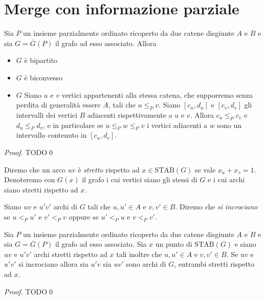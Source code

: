 \section{Merge con informazione parziale} 
\begin{lemma}
	\label{structurelemma} Sia \(P\) un insieme parzialmente ordinato ricoperto da due catene disgiunte \(A\) e \(B\) e sia \(G=\overline{G}(P)\) il grafo ad esso associato. Allora 
	\begin{itemize}
		\item \(G\) è bipartito 
		\item \(G\) è biconvesso 
		\item \(G\) Siano \(u\) e \(v\) vertici appartenenti alla stessa catena, che supporremo senza perdita di generalità essere \(A\), tali che \(u\le_{P} v\). Siano \([c_u,d_u]\) e \([c_v,d_v]\) gli intervalli dei vertici \(B\) adiacenti rispettivamente a \(u\) e \(v\). Allora \(c_u\le_{P} c_v\) e \(d_u\le_{P} d_v\), e in particolare se \(u\le_{P}w\le_{P}v\) i vertici adiacenti a \(w\) sono un intervallo contenuto in \([c_u,d_v]\). 
	\end{itemize}
\end{lemma}
\begin{proof}
	TODO\qed 
\end{proof}
\begin{definition}
	Diremo che un arco \(uv\) è \emph{stretto} rispetto ad \(x\in\text{STAB}(G)\) se vale \(x_u+x_v=1\). Denoteremo con \(G(x)\) il grafo i cui vertici siano gli stessi di \(G\) e i cui archi siano stretti rispetto ad \(x\). 
\end{definition}
\begin{definition}
	Siano \(uv\) e \(u'v'\) archi di \(G\) tali che \(u,u'\in A\) e \(v,v'\in B\). Diremo che \emph{si incrociano} se \(u<_{P}u'\) e \(v'<_{P}v\) oppure se \(u'<_{P}u\) e \(v<_{P}v'\). 
\end{definition}
\begin{lemma}
	\label{crossinglemma} Sia \(P\) un insieme parzialmente ordinato ricoperto da due catene disgiunte \(A\) e \(B\) e sia \(G=\overline{G}(P)\) il grafo ad esso associato. Sia \(x\) un punto di \(\text{STAB}(G)\) e siano \(uv\) e \(u'v'\) archi stretti rispetto ad \(x\) tali inoltre che \(u,u'\in A\) e \(v,v'\in B\). Se \(uv\) e \(u'v'\) si incrociano allora sia \(u'v\) sia \(uv'\) sono archi di \(G\), entrambi stretti rispetto ad \(x\). 
\end{lemma}
\begin{proof}
	TODO\qed 
\end{proof}
